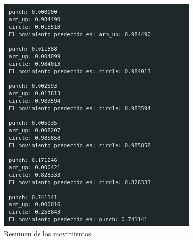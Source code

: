 \begin{figure}[H]
\centering
\includegraphics[width=.40\linewidth]{Imagenes/11.png}
 \caption{Resumen de los movimientos.}
 \label{moves}
\end{figure}

\newpage


\newpage
